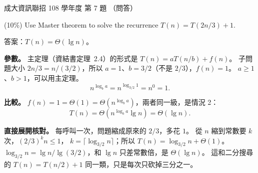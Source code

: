 \begin{pastexam}[label={px:ncku-108-prog-07}]{成大資訊聯招 108 學年度 第 7 題}
（問答）

(10\%) Use Master theorem to solve the recurrence $T(n)=T(2n/3)+1$.
\end{pastexam}

\begin{pastsoln}
答案：$T(n) = \Theta(\lg n)$。

\textbf{參數。} 主定理（資結書定理~2.4）的形式是 $T(n) = aT(n/b) + f(n)$。 子問題大小 $2n/3 = n/(3/2)$，所以
$a = 1$、$b = 3/2$（不是 $2/3$），$f(n) = 1$。 $a \ge 1$、$b > 1$，可以用主定理。
\[
n^{\log_b a} = n^{\log_{3/2} 1} = n^0 = 1 .
\]

\textbf{比較。} $f(n) = 1 = \Theta(1) = \Theta(n^{\log_b a})$，兩者同一級，是情況 2：
\[
T(n) = \Theta(n^{\log_b a} \lg n) = \Theta(\lg n).
\]

\textbf{直接展開核對。} 每呼叫一次，問題縮成原來的 $2/3$，多花 $1$。 從 $n$ 縮到常數要 $k$ 次，$(2/3)^k n \le 1$，
$k = \lceil \log_{3/2} n \rceil$；所以 $T(n) = \log_{3/2} n + \Theta(1)$。 $\log_{3/2} n = \lg n / \lg(3/2)$，和
$\lg n$ 只差常數倍，是 $\Theta(\lg n)$。 這和二分搜尋的 $T(n) = T(n/2) + 1$ 同一類，只是每次只砍掉三分之一。
\end{pastsoln}
